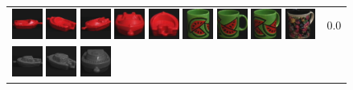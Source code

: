 \begin{figure}[tbp]
\begin{center}
\begin{tabular}{m{11cm} | m{3cm} |}
\includegraphics[width=1cm]{coil/beeld-19.eps}
\includegraphics[width=1cm]{coil/beeld-22.eps}
\includegraphics[width=1cm]{coil/beeld-21.eps}
\includegraphics[width=1cm]{coil/beeld-20.eps}
\includegraphics[width=1cm]{coil/beeld-23.eps}
\includegraphics[width=1cm]{coil/beeld-32.eps}
\includegraphics[width=1cm]{coil/beeld-30.eps}
\includegraphics[width=1cm]{coil/beeld-33.eps}
\includegraphics[width=1cm]{coil/beeld-63.eps}
& {\scriptsize 0.0}
\\
\includegraphics[width=1cm]{coil/beeld-24.eps}
\includegraphics[width=1cm]{coil/beeld-25.eps}
\includegraphics[width=1cm]{coil/beeld-28.eps}

\end{tabular}
\end{center}
\end{figure}
